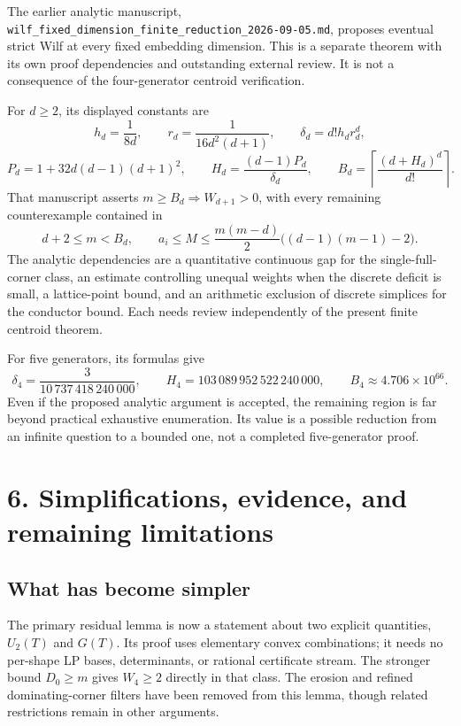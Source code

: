 \documentclass[
  11pt,
  a4paper,
]{article}
\let\oldsection\section
\renewcommand{\section}{\Needspace{7\baselineskip}\oldsection}
\begin{document}
The earlier analytic manuscript,
\texttt{wilf\_fixed\_dimension\_finite\_reduction\_2026-09-05.md},
proposes eventual strict Wilf at every fixed embedding dimension. This
is a separate theorem with its own proof dependencies and outstanding
external review. It is not a consequence of the four-generator centroid
verification.

For \(d\ge2\), its displayed constants are \[
h_d=\frac1{8d},\qquad r_d=\frac1{16d^2(d+1)},\qquad
\delta_d=d!h_dr_d^d,
\] \[
P_d=1+32d(d-1)(d+1)^2,\qquad
H_d=\frac{(d-1)P_d}{\delta_d},\qquad
B_d=\left\lceil\frac{(d+H_d)^d}{d!}\right\rceil.
\] That manuscript asserts \(m\ge B_d\Rightarrow W_{d+1}>0\), with every
remaining counterexample contained in \[
d+2\le m<B_d,\qquad
a_i\le M\le\frac{m(m-d)}2\bigl((d-1)(m-1)-2\bigr).
\tag{HD13}
\] The analytic dependencies are a quantitative continuous gap for the
single-full-corner class, an estimate controlling unequal weights when
the discrete deficit is small, a lattice-point bound, and an arithmetic
exclusion of discrete simplices for the conductor bound. Each needs
review independently of the present finite centroid theorem.

For five generators, its formulas give \[
\delta_4=\frac3{10\,737\,418\,240\,000},\qquad
H_4=103\,089\,952\,522\,240\,000,
\qquad B_4\approx4.706\times10^{66}.
\] Even if the proposed analytic argument is accepted, the remaining
region is far beyond practical exhaustive enumeration. Its value is a
possible reduction from an infinite question to a bounded one, not a
completed five-generator proof.

\hypertarget{simplifications-evidence-and-remaining-limitations}{%
\section{6. Simplifications, evidence, and remaining
limitations}\label{simplifications-evidence-and-remaining-limitations}}

\hypertarget{what-has-become-simpler}{%
\subsection{What has become simpler}\label{what-has-become-simpler}}

The primary residual lemma is now a statement about two explicit
quantities, \(U_2(T)\) and \(G(T)\). Its proof uses elementary convex
combinations; it needs no per-shape LP bases, determinants, or rational
certificate stream. The stronger bound \(D_0\ge m\) gives \(W_4\ge2\)
directly in that class. The erosion and refined dominating-corner
filters have been removed from this lemma, though related restrictions
remain in other arguments.
\end{document}
